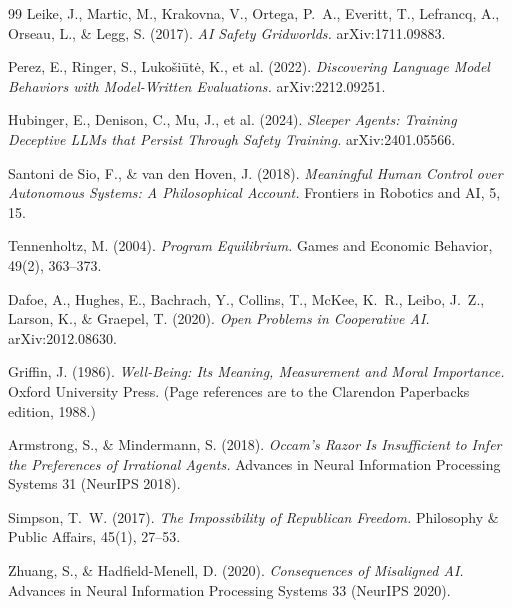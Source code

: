 \documentclass[11pt]{article}
\theoremstyle{definition}
\begin{document}
\begin{thebibliography}{99}
Leike, J., Martic, M., Krakovna, V., Ortega, P.~A., Everitt, T., Lefrancq, A., Orseau, L., \& Legg, S. (2017). \emph{AI Safety Gridworlds.} arXiv:1711.09883.

Perez, E., Ringer, S., Luko\v{s}i\={u}t\.{e}, K., et al. (2022). \emph{Discovering Language Model Behaviors with Model-Written Evaluations.} arXiv:2212.09251.

Hubinger, E., Denison, C., Mu, J., et al. (2024). \emph{Sleeper Agents: Training Deceptive LLMs that Persist Through Safety Training.} arXiv:2401.05566.

Santoni de Sio, F., \& van den Hoven, J. (2018). \emph{Meaningful Human Control over Autonomous Systems: A Philosophical Account.} Frontiers in Robotics and AI, 5, 15.

Tennenholtz, M. (2004). \emph{Program Equilibrium.} Games and Economic Behavior, 49(2), 363--373.

Dafoe, A., Hughes, E., Bachrach, Y., Collins, T., McKee, K.~R., Leibo, J.~Z., Larson, K., \& Graepel, T. (2020). \emph{Open Problems in Cooperative AI.} arXiv:2012.08630.

Griffin, J. (1986). \emph{Well-Being: Its Meaning, Measurement and Moral Importance.} Oxford University Press. (Page references are to the Clarendon Paperbacks edition, 1988.)

Armstrong, S., \& Mindermann, S. (2018). \emph{Occam's Razor Is Insufficient to Infer the Preferences of Irrational Agents.} Advances in Neural Information Processing Systems 31 (NeurIPS 2018).

Simpson, T.~W. (2017). \emph{The Impossibility of Republican Freedom.} Philosophy \& Public Affairs, 45(1), 27--53.

Zhuang, S., \& Hadfield-Menell, D. (2020). \emph{Consequences of Misaligned AI.} Advances in Neural Information Processing Systems 33 (NeurIPS 2020).

\end{thebibliography}
\end{document}
